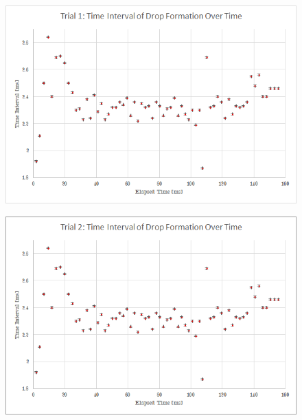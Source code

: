 \documentclass[a4paper]{article}
\begin{document}
\begin{figure}[H]
\centering
\begin{minipage}{.5\textwidth}
  \centering
  \includegraphics[width=\linewidth]{sink1.png}
  \label{fig:test1}
\end{minipage}%
\begin{minipage}{.5\textwidth}
  \centering
  \includegraphics[width=\linewidth]{sink2.png}
  \label{fig:test2}
\end{minipage}
\end{figure}
\end{document}
